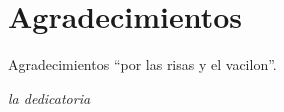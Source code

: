 \section*{\qquad \qquad \qquad \qquad Agradecimientos}

Agradecimientos ``por las risas y el vacilon''.

\cleardoublepage
\thispagestyle{empty}
\begin{flushright}
\itshape
la dedicatoria
\end{flushright}
